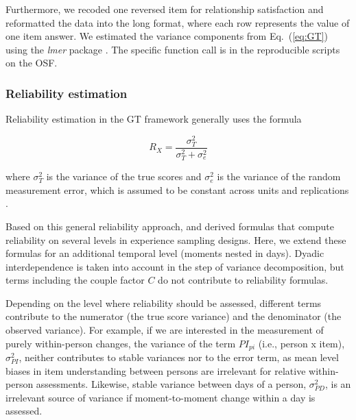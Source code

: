 \documentclass[jou,a4paper,draftfirst]{apa6}\usepackage[]{graphicx}\usepackage[]{color}
\begin{document}
Furthermore, we recoded one reversed item for relationship satisfaction and reformatted the data into the long format, where each row represents the value of one item answer.
We estimated the variance components from Eq.~(\ref{eq:GT}) using the \emph{lmer} package \parencite{bates_FittingLinearMixedEffects_2015}. The specific function call is in the reproducible scripts on the OSF.




\subsubsection{Reliability estimation}

Reliability estimation in the GT framework generally uses the formula

\begin{equation}
\label{eq:R_general}
R_X = \frac{ \sigma^2_{T} }{ \sigma^2_{T} + \sigma^2_{e}}
\end{equation}

where $\sigma^2_{T}$ is the variance of the true scores and $\sigma^2_{e}$ is the variance of the random measurement error, which is assumed to be constant across units and replications \parencite{shrout_Psychometrics_2012}.

Based on this general reliability approach, \textcite{cranford_ProcedureEvaluatingSensitivity_2006} and \textcite{shrout_Psychometrics_2012} derived formulas that compute reliability on several levels in experience sampling designs. Here, we extend these formulas for an additional temporal level (moments nested in days). Dyadic interdependence is taken into account in the step of variance decomposition, but terms including the couple factor $C$ do not contribute to reliability formulas.

Depending on the level where reliability should be assessed, different terms contribute to the numerator (the true score variance) and the denominator (the observed variance). For example, if we are interested in the measurement of purely within-person changes, the variance of the term \emph{$PI_{pi}$} (i.e., person x item), $\sigma^2_{PI}$, neither contributes to stable variances nor to the error term, as mean level biases in item understanding between persons are irrelevant for relative within-person assessments. Likewise, stable variance between days of a person, $\sigma^2_{PD}$, is an irrelevant source of variance if moment-to-moment change within a day is assessed.

\end{document}
